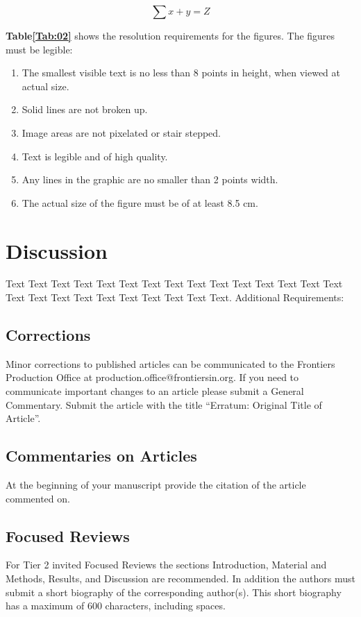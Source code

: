 \documentclass{frontiersSCNS} %
\begin{document}
\begin{equation}
\sum x+ y =Z\label{eq:01}
\end{equation}

\textbf{Table\ref{Tab:02}} shows the resolution requirements for the figures. The figures must be legible:
\begin{enumerate}
\item The smallest visible text is no less than 8 points in height, when viewed at actual size.
\item Solid lines are not broken up.
\item Image areas are not pixelated or stair stepped.
\item Text is legible and of high quality.
\item Any lines in the graphic are no smaller than 2 points width.
\item The actual size of the figure must be of at least 8.5 cm.
\end{enumerate}

\section{Discussion}

Text Text Text Text Text Text  Text Text Text Text Text Text Text Text Text  Text Text Text Text Text Text Text Text Text Text.
Additional Requirements:
\subsection{Corrections}

Minor corrections to published articles can be communicated to the Frontiers Production Office at production.office@frontiersin.org. If you need to communicate important changes to an article please submit a General Commentary. Submit the article with the title “Erratum: Original Title of Article”.

\subsection{Commentaries on Articles}

At the beginning of your manuscript provide the citation of the article commented on.

\subsection{Focused Reviews}

For Tier 2 invited Focused Reviews the sections Introduction, Material and Methods, Results, and Discussion are recommended. In addition the authors must submit a short biography of the corresponding author(s). This short biography has a maximum of 600 characters, including spaces.
\end{document}
